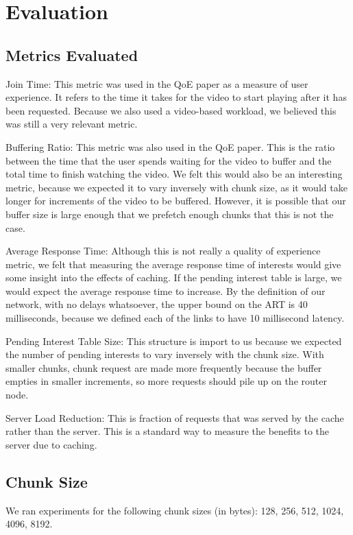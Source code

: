 \section{Evaluation} \label{sec:eval}

\subsection{Metrics Evaluated} \label{sec:metrics}

Join Time: This metric was used in the QoE paper as a measure of user
experience. It refers to the time it takes for the video to start playing after
it has been requested. Because we also used a video-based workload, we believed
this was still a very relevant metric.

Buffering Ratio: This metric was also used in the QoE paper. This is the ratio
between the  time that the user spends waiting for the video to buffer and the
total time to finish watching the video. We felt this would also be an
interesting metric, because we expected it to vary inversely with chunk size, as
it would take longer for increments of the video to be buffered. However, it is
possible that our buffer size is large enough that we prefetch enough chunks
that this is not the case.

Average Response Time: Although this is not  really a quality of experience
metric, we felt that measuring the average response time of interests would give
some insight into the effects of caching. If the pending interest table is
large, we would expect the average response time to increase. By the definition
of our network, with no delays whatsoever, the upper bound on the ART is 40
milliseconds, because we defined each of the links to have 10 millisecond
latency.

Pending Interest Table Size: This structure is import to us because we expected
the number of pending interests to vary inversely with the chunk size. With
smaller chunks, chunk request are made more frequently because the buffer
empties in smaller increments, so more requests should pile up on the router
node.

Server Load Reduction: This is fraction of requests that was served by the cache
rather than the server. This is a standard way to measure the benefits to the
server due to caching.

\subsection{Chunk Size} \label{sec:chunksize}

We ran experiments for the following chunk sizes (in bytes): 128, 256, 512,
1024, 4096, 8192.

